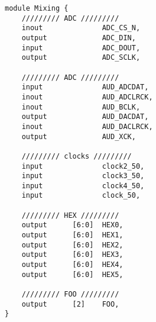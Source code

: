 \documentclass{article}
\begin{document}
\begin{lstlisting}[style={verilog-style}]
module Mixing {
    ///////// ADC /////////
    inout              ADC_CS_N,
    output             ADC_DIN,
    input              ADC_DOUT,
    output             ADC_SCLK,

    ///////// ADC /////////
    input              AUD_ADCDAT,
    inout              AUD_ADCLRCK,
    inout              AUD_BCLK,
    output             AUD_DACDAT,
    inout              AUD_DACLRCK,
    output             AUD_XCK,

    ///////// clocks /////////
    input              clock2_50,
    input              clock3_50,
    input              clock4_50,
    input              clock_50,

    ///////// HEX /////////
    output      [6:0]  HEX0,
    output      [6:0]  HEX1,
    output      [6:0]  HEX2,
    output      [6:0]  HEX3,
    output      [6:0]  HEX4,
    output      [6:0]  HEX5,
 
    ///////// FOO /////////
    output      [2]    FOO,
}
\end{lstlisting}
\end{document}
